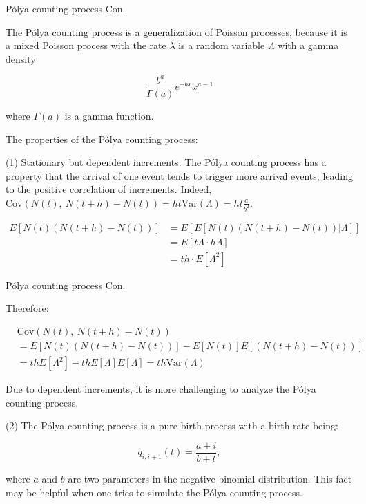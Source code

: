\documentclass{beamer}
\begin{document}
\begin{frame}{Pólya counting process Con.}

    {\footnotesize \footnotesize
    \par The Pólya counting process is a generalization of Poisson processes, because it is a mixed Poisson process with the rate \( \lambda \) is a random variable \( \Lambda \) with a gamma density

    \[
    \frac{b^a}{\Gamma(a)} e^{-bx}x^{a-1}
    \]

    \par where \( \Gamma(a) \) is a gamma function.
    
    \vspace{1em}
    \par  \pause The properties of the Pólya counting process:
    \vspace{1em}
    \par (1) Stationary but dependent increments. The Pólya counting process
    has a property that the arrival of one event tends to trigger more arrival events,
    leading to the positive correlation of increments. Indeed, $\text{Cov}(N(t),\ N(t+h)-N(t)) = ht\text{Var}(\Lambda) = ht\frac{a}{b^{2}}.$  \pause 
    \par [Proof]
    \begin{align*}
        E[N(t)(N(t+h)-N(t))] &= E[E[N(t)(N(t+h)-N(t))|\Lambda]]\\ 
        &= E[t\Lambda\cdot h\Lambda]\\&= th\cdot E[\Lambda^{2}]
    \end{align*}

    }
    
\end{frame}

\begin{frame}{Pólya counting process Con.}

    {\footnotesize \footnotesize
    \par Therefore:

    \[
    \begin{aligned}
    &\text{Cov}(N(t),\ N(t+h)-N(t)) \\
    &= E[N(t)(N(t+h)-N(t))]-E[N(t)]E[(N(t+h)-N(t))] \\
    &= thE[\Lambda^{2}]-thE[\Lambda]E[\Lambda] = th\text{Var}(\Lambda)
    \end{aligned}
    \]
    \par Due to dependent increments, it is more challenging to analyze the Pólya counting process.
    \vspace{1em}
    \par  \pause  (2) The Pólya counting process is a pure birth process with a birth rate being:

    \[
    q_{i,i+1}(t) = \frac{a+i}{b+t},
    \]

    \par where \(a\) and \(b\) are two parameters in the negative binomial distribution. 
    This fact may be helpful when one tries to simulate the Pólya counting process.
    

    }
    
\end{frame}
\end{document}
